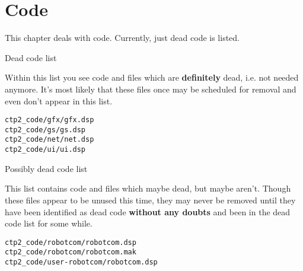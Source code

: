 \chapter{Code\label{cha:code}}
This chapter deals with code. Currently, just dead code is listed.
\begin{section}{Dead code list}

Within this list you see code and files which are \textbf{definitely} dead, i.e. not needed anymore. It's most likely that these files once may be scheduled for removal and even don't appear in this list.

\begin{verbatim}
ctp2_code/gfx/gfx.dsp
ctp2_code/gs/gs.dsp
ctp2_code/net/net.dsp
ctp2_code/ui/ui.dsp
\end{verbatim}

\end{section}%

\begin{section}{Possibly dead code list}

This list contains code and files which maybe dead, but maybe aren't. Though these files appear to be unused this time, they may never be removed until they have been identified as dead code \textbf{without any doubts} and been in the dead code list for some while.

\begin{verbatim}
ctp2_code/robotcom/robotcom.dsp
ctp2_code/robotcom/robotcom.mak
ctp2_code/user-robotcom/robotcom.dsp
\end{verbatim}

\end{section}%
